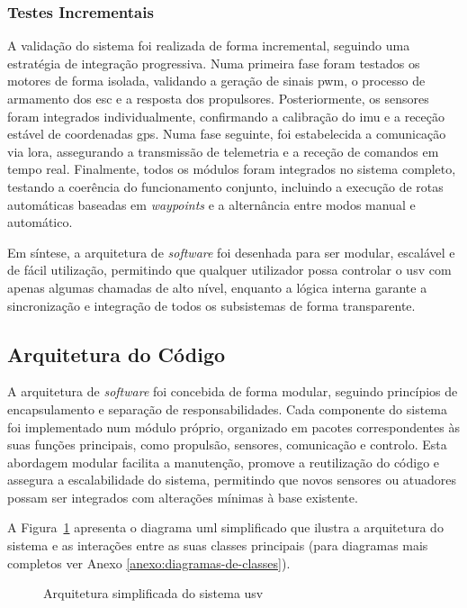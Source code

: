 \subsubsection{Testes Incrementais}

A validação do sistema foi realizada de forma incremental, seguindo uma estratégia de integração progressiva. Numa primeira fase foram testados os motores de forma isolada, validando a geração de sinais \gls{pwm}, o processo de armamento dos \gls{esc} e a resposta dos propulsores. Posteriormente, os sensores foram integrados individualmente, confirmando a calibração do \gls{imu} e a receção estável de coordenadas \gls{gps}. Numa fase seguinte, foi estabelecida a comunicação via \gls{lora}, assegurando a transmissão de telemetria e a receção de comandos em tempo real. Finalmente, todos os módulos foram integrados no sistema completo, testando a coerência do funcionamento conjunto, incluindo a execução de rotas automáticas baseadas em \emph{waypoints} e a alternância entre modos manual e automático.

Em síntese, a arquitetura de \emph{software} foi desenhada para ser modular, escalável e de fácil utilização, permitindo que qualquer utilizador possa controlar o \gls{usv} com apenas algumas chamadas de alto nível, enquanto a lógica interna garante a sincronização e integração de todos os subsistemas de forma transparente.

\subsection{Arquitetura do Código}
\label{subsec:arquitetura-codigo}

A arquitetura de \emph{software} foi concebida de forma modular, seguindo princípios de encapsulamento e separação de responsabilidades. Cada componente do sistema foi implementado num módulo próprio, organizado em pacotes correspondentes às suas funções principais, como propulsão, sensores, comunicação e controlo. Esta abordagem modular facilita a manutenção, promove a reutilização do código e assegura a escalabilidade do sistema, permitindo que novos sensores ou atuadores possam ser integrados com alterações mínimas à base existente.  

A Figura~\ref{fig:uml-simplificado} apresenta o diagrama \gls{uml} simplificado que ilustra a arquitetura do sistema e as interações entre as suas classes principais (para diagramas mais completos ver Anexo \ref{anexo:diagramas-de-classes}). 

\begin{figure}[H]
  \centering
  \resizebox{\textwidth}{!}{%
  }
  \caption{Arquitetura simplificada do sistema \gls{usv}}
  \label{fig:uml-simplificado}
\end{figure}

